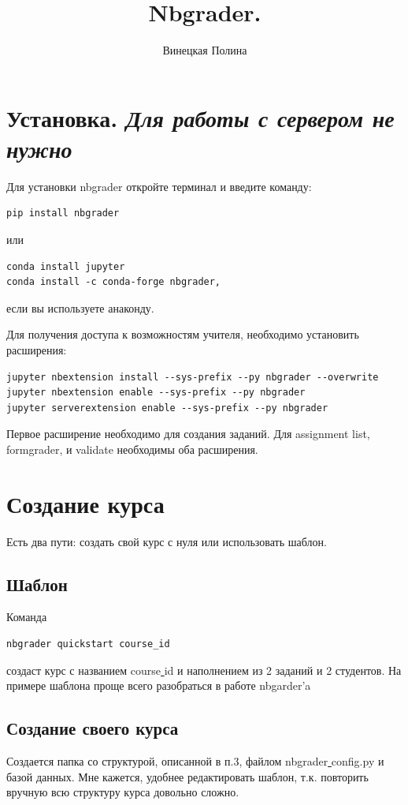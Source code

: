 \documentclass[a4paper,12pt]{article}
\title{Nbgrader.}
\author{Винецкая Полина}
\begin{document}
\maketitle
\tableofcontents
\section{Установка.\small \textit{ Для работы с сервером не нужно}} 

Для установки nbgrader откройте терминал и введите команду:
\begin{verbatim}
pip install nbgrader
\end{verbatim}
или
\begin{verbatim}
conda install jupyter
conda install -c conda-forge nbgrader,
\end{verbatim}
если вы используете анаконду.

Для получения доступа к возможностям учителя, 
необходимо установить расширения:
\begin{verbatim}
jupyter nbextension install --sys-prefix --py nbgrader --overwrite
jupyter nbextension enable --sys-prefix --py nbgrader
jupyter serverextension enable --sys-prefix --py nbgrader
\end{verbatim}
Первое расширение необходимо для создания заданий.
Для assignment list, formgrader, и validate необходимы оба расширения.
\section{Создание курса} Есть два пути: создать свой курс с нуля или использовать шаблон.
\subsection{Шаблон}

Команда
\begin{verbatim}
nbgrader quickstart course_id 
\end{verbatim}
создаст курс с названием course\underline{ }id и наполнением из 2 заданий и 2 студентов. На примере шаблона проще всего разобраться в работе nbgarder'a
\subsection{Создание своего курса}

Создается папка со структурой, описанной в п.3, файлом nbgrader\underline{ }config.py и базой данных. Мне кажется, удобнее  редактировать шаблон, т.к. повторить вручную всю структуру курса довольно сложно.
\end{document}
